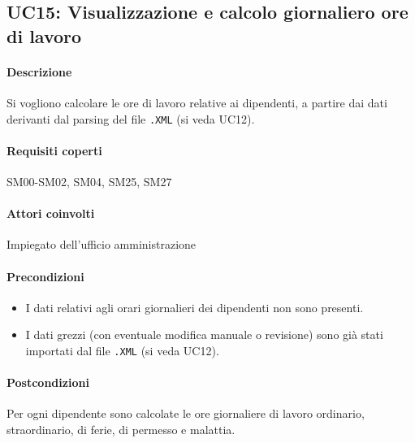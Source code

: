 \subsection{UC15: Visualizzazione e calcolo giornaliero ore di lavoro}
\paragraph{Descrizione}
Si vogliono calcolare le ore di lavoro relative ai dipendenti, a partire dai dati derivanti dal parsing del file \verb|.XML| (si veda UC12).
\paragraph{Requisiti coperti}
SM00-SM02, SM04, SM25, SM27
\paragraph{Attori coinvolti}
Impiegato dell'ufficio amministrazione
\paragraph{Precondizioni}
\begin{itemize}
	\item I dati relativi agli orari giornalieri dei dipendenti non sono presenti.
	\item I dati grezzi (con eventuale modifica manuale o revisione) sono già stati importati dal file \verb|.XML| (si veda UC12).
\end{itemize}
\paragraph{Postcondizioni}
Per ogni dipendente sono calcolate le ore giornaliere di lavoro ordinario, straordinario, di ferie, di permesso e malattia.
